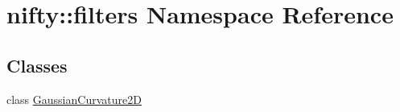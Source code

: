 \hypertarget{namespacenifty_1_1filters}{}\section{nifty\+:\+:filters Namespace Reference}
\label{namespacenifty_1_1filters}
\subsection*{Classes}
\begin{DoxyCompactItemize}
\item 
class \hyperlink{classnifty_1_1filters_1_1GaussianCurvature2D}{Gaussian\+Curvature2D}
\end{DoxyCompactItemize}
